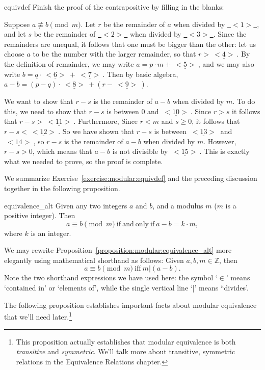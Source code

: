 \begin{exercise}{equivdef}
Finish the proof of the contrapositive by filling in the blanks:

\noindent
Suppose $a \not\equiv b \pmod{m}$. Let $r$ be the remainder of $a$ when divided by \underline{~$<1>$~}, and let $s$ be  the remainder of \underline{~$<2>$~} when divided by \underline{~$<3>$~}. Since the remainders are unequal, it follows that one must be bigger than the other: let us choose $a$ to be the number with the larger remainder, so that $r > \underline{~<4>~}$. By the definition of remainder, we may write $a = p\cdot m + \underline{~<5>~}$, and we may also write $b = q\cdot \underline{~<6>~} + \underline{~<7>~}$. Then by basic algebra, $a - b = (p-q)\cdot \underline{~<8>~} + (r - \underline{~<9>~})$. 

We want to show that $r-s$ is the remainder of $a-b$ when divided by $m$. To do this, we need to show that $r-s$ is between 0 and $\underline{~<10>~}$. Since $r>s$ it follows that $r-s > \underline{~<11>~}$. Furthermore,
Since $r < m$ and $s \ge 0$, it follows that $r - s < \underline{~<12>~}$.  So we have shown that $r-s$ is between $\underline{~<13>~}$ and $\underline{~<14>~}$, so 
$r-s$ is the remainder of $a-b$ when divided by $m$. However, $r-s > 0$, which means that $a-b$ is not divisible by $\underline{~<15>~}$. This is exactly what we needed to prove, so the proof is complete. 
\end{exercise}

We summarize Exercise~\ref{exercise:modular:equivdef} and the preceding discussion together in the following proposition.

\begin{prop}{equivalence_alt}
Given any two integers $a$ and $b$, and a modulus $m$ ($m$ is a positive integer). Then 
\[
a \equiv b \pmod{m} \mathrm{~if~and~only~if~} a - b = k \cdot m,
\]
where $k$ is an integer.
\end{prop}
\noindent
We may rewrite Proposition~\ref{proposition:modular:equivalence_alt} more elegantly using mathematical shorthand as follows: Given $a,b,m \in {\mathbb Z}$, then 
\[
a \equiv b \pmod{m} \mathrm{~iff~} m | (a - b).
\]
Note the two shorthand expressions we have used here:  the symbol  `$\in$'  means `contained in' or `elements of', while the single vertical line `|' means ``divides'.


The following proposition establishes important facts about modular equivalence that we'll need later.\footnote{This proposition actually establishes that modular equivalence is  both \emph{transitive} and \emph{symmetric}. We'll talk more about transitive, symmetric relations in the Equivalence Relations chapter.}

